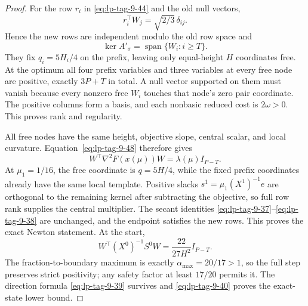 \begin{proof}
For the row \(r_i\) in \eqref{eq:lp-tag-9-44} and the old null vectors,
\begin{equation}
 r_i^\top W_j=\sqrt{2/3}\,\delta_{ij}.
\end{equation}
Hence the new rows are independent modulo the old row space and
\begin{equation}
 \ker A'_\sigma=\operatorname{span}\{W_i:i\geq T\}.
\label{eq:lp-tag-9-48}
\end{equation}
They fix \(q_i=5H_i/4\) on the prefix, leaving only equal-height \(H\)
coordinates free.  At the optimum all four prefix variables and three
variables at every free node are positive, exactly \(3P+T\) in total.  A
null vector supported on them must vanish because every nonzero free \(W_i\)
touches that node's zero pair coordinate.  The positive columns form a basis,
and each nonbasic reduced cost is \(2\omega>0\).  This proves rank and
regularity.

All free nodes have the same height, objective slope, central scalar,
and local curvature.  Equation~\eqref{eq:lp-tag-9-48} therefore gives
\[
 W^\top\nabla^2F(x(\mu))W=\lambda(\mu)I_{P-T}.
\]
At \(\mu_1=1/16\), the free coordinate is \(q=5H/4\), while the fixed
prefix coordinates already have the same local template.  Positive slacks
\(s^1=\mu_1(X^1)^{-1}e\) are orthogonal to the remaining kernel after
subtracting the objective, so full row rank supplies the central multiplier.
The secant identities \eqref{eq:lp-tag-9-37}--\eqref{eq:lp-tag-9-38} are unchanged, and the endpoint satisfies
the new rows.  This proves the exact Newton statement.  At the start,
\begin{equation}
 W^\top(X^0)^{-1}S^0W=\frac{22}{27H^2}I_{P-T}.
\end{equation}
The fraction-to-boundary maximum is exactly
\(\alpha_{\max}=20/17>1\), so the full step preserves strict positivity;
any safety factor at least \(17/20\) permits it.  The direction formula
\eqref{eq:lp-tag-9-39} survives and \eqref{eq:lp-tag-9-40} proves the exact-state lower bound.


\end{proof}
